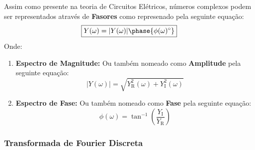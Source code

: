 \documentclass{article}
\begin{document}
                Assim como presente na teoria de Circuitos Elétricos, números complexos podem ser representados através de \textbf{Fasores} como represenado pela seguinte equação:
                    \begin{equation}
                        \boxed{
                            Y(\omega) = |Y(\omega)| \phase{\phi(\omega)^{\circ}}
                        }
                    \end{equation}
                Onde:
                    \begin{enumerate}[noitemsep]
                        \item \textbf{Espectro de Magnitude:} Ou também nomeado como \textbf{Amplitude} pela seguinte equação:
                            \begin{equation*}
                                \boxed{
                                    |Y(\omega)| = \sqrt{Y_{\text{R}}^{2}(\omega) + Y_{\text{I}}^{2}(\omega)}
                                }
                            \end{equation*}

                        \item \textbf{Espectro de Fase:} Ou também nomeado como \textbf{Fase} pela seguinte equação:
                            \begin{equation*}
                                \boxed{
                                    \phi(\omega) = \tan^{-1}
                                    \left(
                                        \frac{Y_{\text{I}}}{Y_{\text{R}}}
                                    \right)
                                }
                            \end{equation*}
                    \end{enumerate}

        \subsubsection{Transformada de Fourier Discreta}
\end{document}
